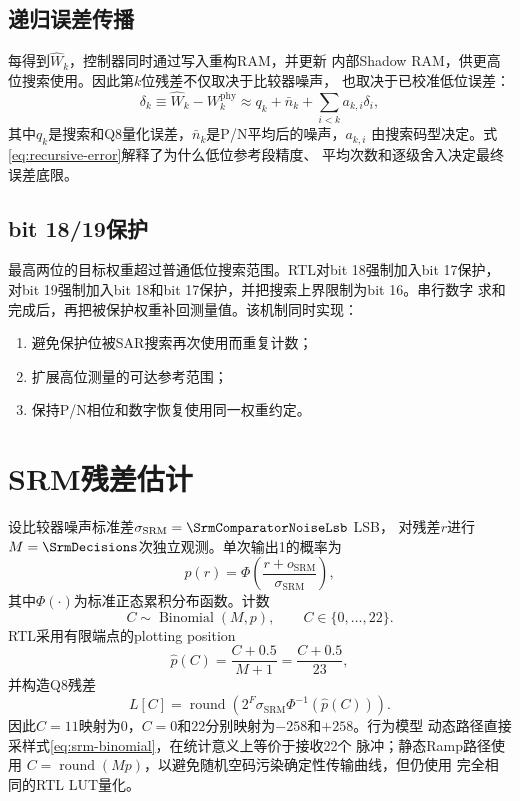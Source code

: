 \documentclass[11pt,a4paper,UTF8,fontset=none,openany]{ctexrep}
\numberwithin{equation}{chapter}
\numberwithin{figure}{chapter}
\numberwithin{table}{chapter}
\begin{document}
\subsection{递归误差传播}

每得到$\widehat{W}_k$，控制器同时通过写入重构RAM，并更新
内部Shadow RAM，供更高位搜索使用。因此第$k$位残差不仅取决于比较器噪声，
也取决于已校准低位误差：
\begin{equation}
  \delta_k
  \equiv \widehat{W}_k-W_k^{\mathrm{phy}}
  \approx q_k+\bar n_k+\sum_{i<k}a_{k,i}\delta_i,
  \label{eq:recursive-error}
\end{equation}
其中$q_k$是搜索和Q8量化误差，$\bar n_k$是P/N平均后的噪声，$a_{k,i}$
由搜索码型决定。式\eqref{eq:recursive-error}解释了为什么低位参考段精度、
平均次数和逐级舍入决定最终误差底限。

\subsection{bit 18/19保护}

最高两位的目标权重超过普通低位搜索范围。RTL对bit 18强制加入bit 17保护，
对bit 19强制加入bit 18和bit 17保护，并把搜索上界限制为bit 16。串行数字
求和完成后，再把被保护权重补回测量值。该机制同时实现：

\begin{enumerate}
  \item 避免保护位被SAR搜索再次使用而重复计数；
  \item 扩展高位测量的可达参考范围；
  \item 保持P/N相位和数字恢复使用同一权重约定。
\end{enumerate}

\section{SRM残差估计}

设比较器噪声标准差$\sigma_{\mathrm{SRM}}=\SrmComparatorNoiseLsb$ LSB，
对残差$r$进行$M=\SrmDecisions$次独立观测。单次输出1的概率为
\begin{equation}
  p(r)=\Phi\!\left(\frac{r+o_{\mathrm{SRM}}}{\sigma_{\mathrm{SRM}}}\right),
  \label{eq:srm-probability}
\end{equation}
其中$\Phi(\cdot)$为标准正态累积分布函数。计数
\begin{equation}
  C\sim\operatorname{Binomial}(M,p),\qquad C\in\{0,\ldots,22\}.
  \label{eq:srm-binomial}
\end{equation}
RTL采用有限端点的plotting position
\begin{equation}
  \widehat p(C)=\frac{C+0.5}{M+1}=\frac{C+0.5}{23},
  \label{eq:srm-position}
\end{equation}
并构造Q8残差
\begin{equation}
  L[C]=\operatorname{round}
  \left(
    2^F\sigma_{\mathrm{SRM}}\Phi^{-1}\!\left(\widehat p(C)\right)
  \right).
  \label{eq:srm-lut}
\end{equation}
因此$C=11$映射为0，$C=0$和$22$分别映射为$-258$和$+258$。行为模型
动态路径直接采样式\eqref{eq:srm-binomial}，在统计意义上等价于接收22个
脉冲；静态Ramp路径使用
$C=\operatorname{round}(Mp)$，以避免随机空码污染确定性传输曲线，但仍使用
完全相同的RTL LUT量化。
\end{document}
